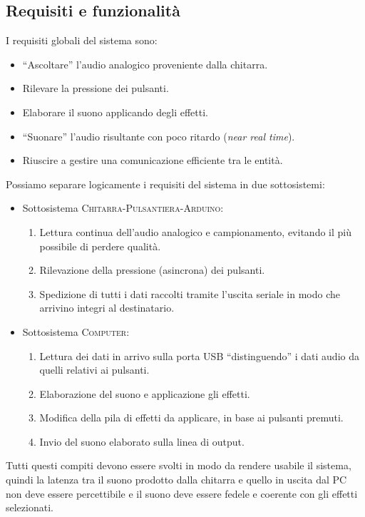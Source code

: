 \documentclass[a4paper,11pt]{article}
\begin{document}
\subsection{Requisiti e funzionalità}
I requisiti globali del sistema sono:
\begin{itemize}
    \item ``Ascoltare'' l'audio analogico proveniente dalla chitarra.
    \item Rilevare la pressione dei pulsanti.
    \item Elaborare il suono applicando degli effetti.
    \item ``Suonare'' l'audio risultante con poco ritardo (\textit{near real time}).
    \item Riuscire a gestire una comunicazione efficiente tra le entità.
\end{itemize}

\noindent
Possiamo separare logicamente i requisiti del sistema in due sottosistemi:
\begin{itemize}
    \item Sottosistema \textsc{Chitarra-Pulsantiera-Arduino}:
    \begin{enumerate}
        \item Lettura continua dell'audio analogico e campionamento, evitando il più possibile di perdere qualità.
        \item Rilevazione della pressione (asincrona) dei pulsanti.
        \item Spedizione di tutti i dati raccolti tramite l'uscita seriale in modo che arrivino integri al destinatario.
    \end{enumerate}
    \item Sottosistema \textsc{Computer}:
    \begin{enumerate}
        \item Lettura dei dati in arrivo sulla porta USB ``distinguendo'' i dati audio da quelli relativi ai pulsanti.
        \item Elaborazione del suono e applicazione gli effetti.
        \item Modifica della pila di effetti da applicare, in base ai pulsanti premuti.
        \item Invio del suono elaborato sulla linea di output.
    \end{enumerate}
\end{itemize}

Tutti questi compiti devono essere svolti in modo da rendere usabile il sistema, quindi la latenza tra il suono prodotto dalla chitarra e quello in uscita dal PC non deve essere percettibile e il suono deve essere fedele e coerente con gli effetti selezionati.
\end{document}

